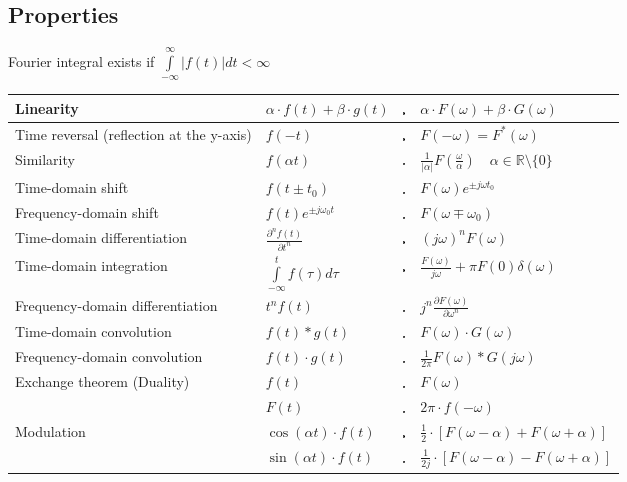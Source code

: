 	\subsection{Properties}
		Fourier integral exists if $\int\limits_{-\infty}^{\infty}|f(t)| dt <
	\infty$\\
		\renewcommand{\arraystretch}{2}
		\begin{tabular}{|p{8cm}|l c l|}
        	\hline
        	Linearity &
        	$\alpha\cdot f(t) + \beta\cdot g(t)$ & $\FT$ & $\alpha\cdot F(\omega) +
        	\beta\cdot G(\omega)$\\
        	\hline
			Time reversal (reflection at the y-axis) &
			$f(-t)$ & $\FT$ & $F(-\omega) = F^*(\omega)$ \\
			\hline
  			Similarity &
  			$f(\alpha t)$ & $\FT$ & $\frac{1}{|\alpha|}F \left( \frac{\omega}{\alpha} \right)
  			\quad\alpha \in\mathbb{R}\setminus \{0\}$\\
  			\hline
  			Time-domain shift &
  			$f(t\pm t_0)$ & $\FT$ & $F(\omega)e^{\pm j\omega t_0}$\\
  			\hline
			Frequency-domain shift &
			$f(t)e^{\pm j\omega_0 t}$ & $\FT$ & $F(\omega\mp\omega_0)$\\
			\hline
			Time-domain differentiation &
			$\frac{\partial^n f(t)}{\partial t^n}$ & $\FT$ & $(j\omega)^n F(\omega)$\\
			\hline
			Time-domain integration &
			$\int\limits_{-\infty}^{t}f(\tau)d\tau $ & $\FT$ &
			$\frac{F(\omega)}{j\omega}+\pi F(0)\delta(\omega)$\\
			\hline
			Frequency-domain differentiation &
			$t^n f(t)$ & $\FT$ & $j^n \frac{\partial F(\omega)}{\partial \omega^n}$\\
			\hline
			Time-domain convolution &
			$f(t) \ast g(t)$ & $\FT$ & $F(\omega) \cdot G(\omega)$\\
			\hline
			Frequency-domain convolution &
			$f(t) \cdot g(t)$ & $\FT$ & $\frac{1}{2\pi}F(\omega) \ast G(j\omega)$\\
			\hline
			Exchange theorem (Duality) &
			$f(t)$ & $\FT$ & $F(\omega)\nonumber$ \\
 			& $F(t)$ & $\FT$ & $2\pi \cdot f(-\omega)$\\
 			\hline
 			Modulation &
 			$\cos(\alpha t) \cdot f(t)$ & $\FT$ & $\frac{1}{2}\cdot
 			\left[F(\omega-\alpha) + F(\omega+\alpha)\right]$\\
 			& $\sin(\alpha t) \cdot f(t)$ & $\FT$ & $\frac{1}{2j}\cdot \left[
 			F(\omega-\alpha) - F(\omega+\alpha)\right]$\\

\end{tabular}
